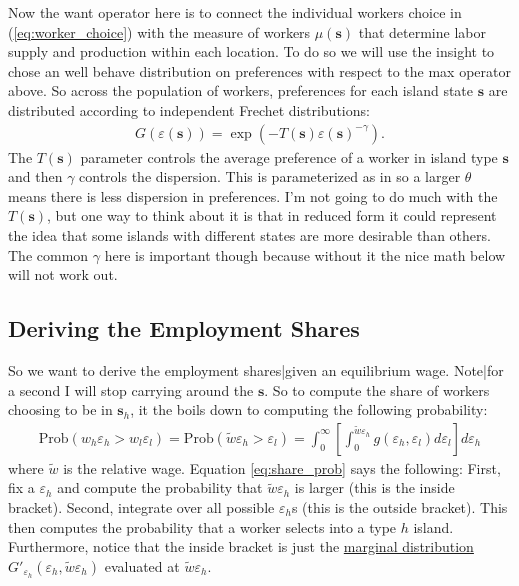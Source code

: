 \documentclass[pdftex,12pt]{article}
\begin{document}
\medskip
\noindent Now the want operator here is to connect the individual workers choice in (\ref{eq:worker_choice}) with the measure of workers $\mu(\textbf{s})$ that determine labor supply and production within each location. To do so we will use the \citet{eaton2002technology} insight to chose an well behave distribution on preferences with respect to the max operator above. So across the population of workers, preferences for each island state $\textbf{s}$ are distributed according to independent Frechet distributions:
\begin{align}
G(\varepsilon(\textbf{s})) = \exp\left(-T(\textbf{s})\varepsilon(\textbf{s})^{-\gamma}\right).
\end{align}
The $T(\textbf{s})$ parameter controls the average preference of a worker in island type $\textbf{s}$ and then $\gamma$ controls the dispersion. This is parameterized as in \citet{eaton2002technology} so a larger $\theta$ means there is less dispersion in preferences. I'm not going to do much with the $T(\textbf{s})$, but one way to think about it is that in reduced form it could represent the idea that some islands with different states are more desirable than others. The common $\gamma$ here is important though because without it the nice math below will not work out.

\subsection{Deriving the Employment Shares}

So we want to derive the employment shares|given an equilibrium wage. Note|for a second I will stop carrying around the $\textbf{s}$. So to compute the share of workers choosing to be in $\textbf{s}_h$, it the boils down to computing the following probability:
\begin{align}
\mathrm{Prob}\left(w_h \varepsilon_h >  w_l\varepsilon_l\right) = \mathrm{Prob}\left(\tilde w \varepsilon_h > \varepsilon_l\right) = \int_0^{\infty}\left[\int_0^{\tilde w\varepsilon_h}g(\varepsilon_h,\varepsilon_l)d\varepsilon_l\right]d\varepsilon_h \label{eq:share_prob}
\end{align}
where $\tilde w$ is the relative wage. Equation \ref{eq:share_prob} says the following: First, fix a $\varepsilon_h$ and compute the probability that $\tilde w \varepsilon_h$ is larger (this is the inside bracket). Second,  integrate over all possible $\varepsilon_h$s (this is the outside bracket). This then computes the probability that a worker selects into a type $h$ island. Furthermore, notice that the inside bracket is just the \href{https://en.wikipedia.org/wiki/Marginal_distribution}{marginal distribution} $G'_{\varepsilon_h}(\varepsilon_h,\tilde w\varepsilon_h)$ evaluated at $\tilde w\varepsilon_h$.
\end{document}
